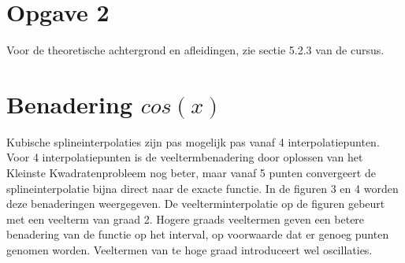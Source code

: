 \documentclass[]{article}
\newcommand{\opgave}[1]{\pagebreak\section*{Opgave #1}}
\begin{document}
\opgave{2}
Voor de theoretische achtergrond en afleidingen, zie sectie 5.2.3 van de cursus. 

\section*{Benadering $cos(x)$}
Kubische splineinterpolaties zijn pas mogelijk pas vanaf 4 interpolatiepunten. Voor 4 interpolatiepunten is de veeltermbenadering door oplossen van het Kleinste Kwadratenprobleem nog beter, maar vanaf 5 punten convergeert de splineinterpolatie bijna direct naar de exacte functie.
In de figuren 3 en 4 worden deze benaderingen weergegeven. De veelterminterpolatie op de figuren gebeurt met een veelterm van graad 2. Hogere graads veeltermen geven een betere benadering van de functie op het interval, op voorwaarde dat er genoeg punten genomen worden.
Veeltermen van te hoge graad introduceert wel oscillaties.
\end{document}
